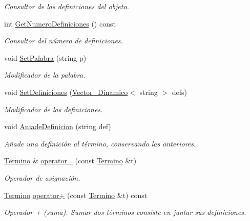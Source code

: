 \begin{DoxyCompactItemize}
\begin{DoxyCompactList}\small\item\em Consultor de las definiciones del objeto. \end{DoxyCompactList}\item 
int \mbox{\hyperlink{classTermino_ad3aac507f0f33d89abf34db00f92606f}{Get\+Numero\+Definiciones}} () const
\begin{DoxyCompactList}\small\item\em Consultor del número de definiciones. \end{DoxyCompactList}\item 
void \mbox{\hyperlink{classTermino_a3a630930f55cbaf5795ba04c54e00534}{Set\+Palabra}} (string p)
\begin{DoxyCompactList}\small\item\em Modificador de la palabra. \end{DoxyCompactList}\item 
void \mbox{\hyperlink{classTermino_a21589c6c6bac237c8ec47e62a5d21c07}{Set\+Definiciones}} (\mbox{\hyperlink{classVector__Dinamico}{Vector\+\_\+\+Dinamico}}$<$ string $>$ defs)
\begin{DoxyCompactList}\small\item\em Modificador de las definiciones. \end{DoxyCompactList}\item 
void \mbox{\hyperlink{classTermino_a93fed012290bc28881288cfd095c8500}{Aniade\+Definicion}} (string def)
\begin{DoxyCompactList}\small\item\em Añade una definición al término, conservando las anteriores. \end{DoxyCompactList}\item 
\mbox{\hyperlink{classTermino}{Termino}} \& \mbox{\hyperlink{classTermino_a7ef9a9aed0e1cf3f1ae098be760946f0}{operator=}} (const \mbox{\hyperlink{classTermino}{Termino}} \&t)
\begin{DoxyCompactList}\small\item\em Operador de asignación. \end{DoxyCompactList}\item 
\mbox{\hyperlink{classTermino}{Termino}} \mbox{\hyperlink{classTermino_a08f2b837973daf93551e1499639194fb}{operator+}} (const \mbox{\hyperlink{classTermino}{Termino}} \&t) const
\begin{DoxyCompactList}\small\item\em Operador + (suma). Sumar dos términos consiste en juntar sus definiciones. \end{DoxyCompactList}\item 

\end{DoxyCompactItemize}

